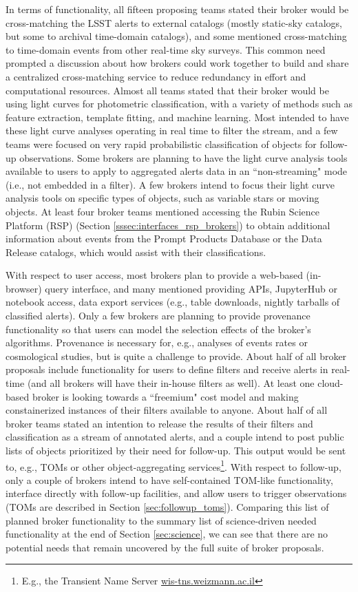 In terms of functionality, all fifteen proposing teams stated their broker would be cross-matching the  {LSST} alerts to external catalogs (mostly static-sky catalogs, but some to archival time-domain catalogs), and some mentioned cross-matching to time-domain events from other real-time sky surveys.
This common need prompted a discussion about how brokers could work together to build and share a centralized cross-matching service to reduce redundancy in effort and computational resources.
Almost all teams stated that their broker would be using light curves for photometric classification, with a variety of methods such as feature extraction, template fitting, and machine learning.
Most intended to have these light curve analyses operating in real time to filter the stream, and a few teams were focused on very rapid probabilistic classification of objects for follow-up observations. 
Some brokers are planning to have the light curve analysis tools available to users to apply to aggregated alerts data in an ``non-streaming" mode (i.e., not embedded in a filter). 
A few brokers intend to focus their light curve analysis tools on specific types of objects, such as variable stars or moving objects.
At least four broker teams mentioned accessing the Rubin Science Platform (RSP) (Section \ref{sssec:interfaces_rsp_brokers}) to obtain additional information about events from the Prompt Products Database or the  {Data Release} catalogs, which would assist with their classifications.

With respect to user access, most brokers plan to provide a web-based (in-browser) query interface, and many mentioned providing APIs, JupyterHub or notebook access, data export services (e.g., table downloads, nightly tarballs of classified alerts).
Only a few brokers are planning to provide  {provenance} functionality so that users can model the selection effects of the broker's algorithms.
Provenance is necessary for, e.g., analyses of events rates or cosmological studies, but is quite a challenge to provide.
About half of all broker proposals include functionality for users to define filters and receive alerts in real-time (and all brokers will have their in-house filters as well).
At least one cloud-based broker is looking towards a ``freemium" cost model and making constainerized instances of their filters available to anyone. 
About half of all broker teams stated an intention to release the results of their filters and classification as a stream of annotated alerts, and a couple intend to post public lists of objects prioritized by their need for follow-up.
This output would be sent to, e.g., TOMs or other object-aggregating services\footnote{E.g., the Transient Name Server \url{wis-tns.weizmann.ac.il}}.
With respect to follow-up, only a couple of brokers intend to have self-contained  {TOM}-like functionality, interface directly with follow-up facilities, and allow users to trigger observations (TOMs are described in Section \ref{sec:followup_toms}).
Comparing this list of planned broker functionality to the summary list of science-driven needed functionality at the end of Section \ref{sec:science}, we can see that there are no potential needs that remain uncovered by the full suite of broker proposals.

